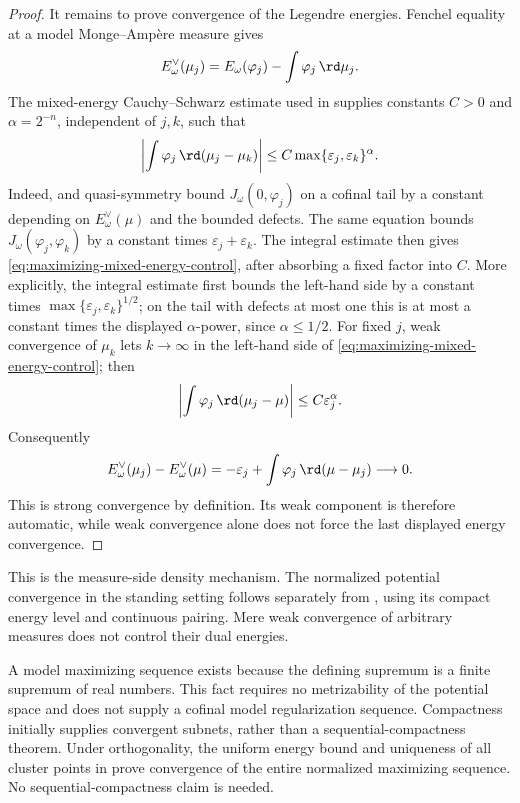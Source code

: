 \begin{proof}
It remains to prove convergence of the Legendre energies.  Fenchel equality
at a model Monge--Amp\`ere measure gives
\[
 E_\omega^\vee(\mu_j)
 =E_\omega(\varphi_j)-\int\varphi_j\,\rd\mu_j.
\]
The mixed-energy Cauchy--Schwarz estimate used in
 supplies constants
$C>0$ and $\alpha=2^{-n}$, independent of $j,k$, such that
\begin{equation}\label{eq:maximizing-mixed-energy-control}
 \left|\int\varphi_j\,\rd(\mu_j-\mu_k)\right|
 \leq C\max\{\varepsilon_j,\varepsilon_k\}^{\alpha}.
\end{equation}
Indeed, \cite[Proposition~2.2, equation~(2.7)]{BJ25FiniteEnergy}
and quasi-symmetry bound $J_\omega(0,\varphi_j)$ on a cofinal tail by a
constant depending on $E_\omega^\vee(\mu)$ and the bounded defects.
The same equation bounds $J_\omega(\varphi_j,\varphi_k)$ by a constant
times $\varepsilon_j+\varepsilon_k$.  The integral estimate
\cite[Theorem~1.33, equation~(1.37)]{BJ25FiniteEnergy} then gives
\eqref{eq:maximizing-mixed-energy-control}, after absorbing a fixed factor into $C$.  More explicitly, the integral estimate first
bounds the left-hand side by a constant times
$\max\{\varepsilon_j,\varepsilon_k\}^{1/2}$; on the tail with defects
at most one this is at most a constant times the displayed
$\alpha$-power, since $\alpha\leq1/2$.
For fixed $j$, weak convergence of $\mu_k$ lets
$k\to\infty$ in the left-hand side of
\eqref{eq:maximizing-mixed-energy-control}; then
\[
 \left|\int\varphi_j\,\rd(\mu_j-\mu)\right|
 \leq C\varepsilon_j^\alpha.
\]
Consequently
\[
 E_\omega^\vee(\mu_j)-E_\omega^\vee(\mu)
 =-\varepsilon_j+
   \int\varphi_j\,\rd(\mu-\mu_j)\longrightarrow0.
\]
This is strong convergence by definition.  Its weak component is therefore
automatic, while weak convergence alone does not force the last displayed
energy convergence.
\end{proof}

This is the measure-side density mechanism.  The normalized potential
convergence in the standing setting follows separately from
, using its compact energy level
and continuous pairing.  Mere weak convergence of arbitrary measures
does not control their dual energies.

\begin{remark}
\label{rem:ch28-maximizing-sequence-exists}
A model maximizing sequence exists because the defining supremum is a
finite supremum of real numbers.  This fact requires no metrizability
of the potential space and does not supply a cofinal model
regularization sequence.  Compactness initially supplies convergent
subnets, rather than a sequential-compactness theorem.  Under
orthogonality, the uniform energy bound and uniqueness of all cluster
points in  prove convergence of
the entire normalized maximizing sequence.  No sequential-compactness
claim is needed.
\end{remark}

